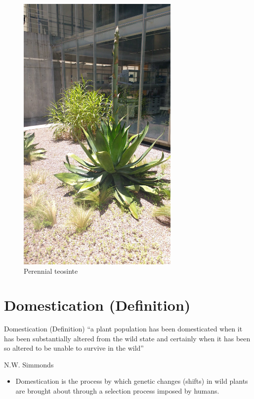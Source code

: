 \documentclass[11pt,ignorenonframetext,aspectratio=169]{beamer}
\providecommand{\tightlist}{%
  \setlength{\itemsep}{0pt}\setlength{\parskip}{0pt}}
\begin{document}
\begin{frame}{}
\protect\hypertarget{section-1}{}
\begin{figure}

{\centering \includegraphics[width=0.7\textwidth, keepaspectratio,height=0.9\textheight]{./images/Perennial_teosinte} 

}

\caption{Perennial teosinte}\label{fig:weed-vs-crop}
\end{figure}
\end{frame}

\hypertarget{domestication-definition}{%
\section{Domestication (Definition)}\label{domestication-definition}}

\begin{frame}[standout]{Domestication (Definition)}
``a plant population has been domesticated when it has been
substantially altered from the wild state and certainly when it has been
so altered to be unable to survive in the wild''

N.W. Simmonds

\begin{itemize}
\tightlist
\item
  Domestication is the process by which genetic changes (shifts) in wild
  plants are brought about through a selection process imposed by
  humans.
\end{itemize}
\end{frame}
\end{document}
